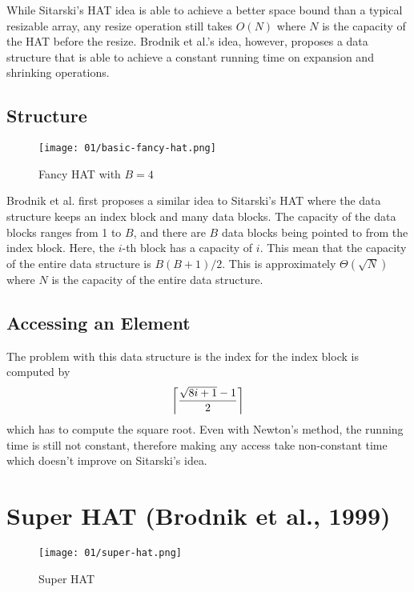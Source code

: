 While Sitarski's HAT idea is able to achieve a better space bound than a typical resizable array,
any resize operation still takes $O(N)$ where $N$ is the capacity of the HAT before the resize.
Brodnik et al.'s idea, however, proposes a data structure that is able to achieve a constant
running time on expansion and shrinking operations.

\subsection*{Structure}

\begin{wrapfigure}[10]{L}{0.35\textwidth}
	\centering
	\texttt{[image: 01/basic-fancy-hat.png]}
	\caption{Fancy HAT with $B=4$}\label{basic-fancy-hat}
\end{wrapfigure}

Brodnik et al. first proposes a similar idea to Sitarski's HAT where the data structure keeps an 
index block and many data blocks. The capacity of the data blocks ranges from 1 to $B$, and there 
are $B$ data blocks being pointed to from the index block. Here, the $i$-th block has a capacity of
$i$. This mean that the capacity of the entire data structure is $B(B+1)/2$. This is approximately
$\Theta(\sqrt{N})$ where $N$ is the capacity of the entire data structure.

\subsection*{Accessing an Element}

The problem with this data structure is the index for the index block is computed by 
\[ {\left\lceil \frac{\sqrt{8i + 1} - 1}{2} \right\rceil} \]
which has to compute the square root. Even with Newton's method, the running time is still not
constant, therefore making any access take non-constant time which doesn't improve on Sitarski's idea.

\endgroup

\begingroup

\section{Super HAT (Brodnik et al., 1999)}

\begin{wrapfigure}[16]{l}{0.4\textwidth}
	\centering
	\texttt{[image: 01/super-hat.png]}
	\caption{Super HAT}\label{super-hat-structure}
\end{wrapfigure}

